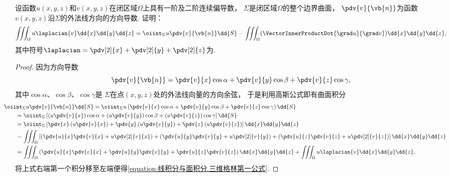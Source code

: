 \begin{example}[三维格林第一公式]
设函数\(u(x,y,z)\)和\(v(x,y,z)\)在闭区域\(\Omega\)上具有一阶及二阶连续偏导数，
\(\Sigma\)是闭区域\(\Omega\)的整个边界曲面，
\(\pdv{v}{\vb{n}}\)为函数\(v(x,y,z)\)沿\(\Sigma\)的外法线方向的方向导数.
证明：\begin{equation}\label{equation:线积分与面积分.三维格林第一公式}
	\iiint_\Omega u \laplacian{v} \dd{x}\dd{y}\dd{z}
	= \oiint_\Sigma u \pdv{v}{\vb{n}} \dd{S}
	- \iiint_\Omega (\VectorInnerProductDot{\grad u}{\grad v}) \dd{x}\dd{y}\dd{z},
\end{equation}
其中符号\(\laplacian = \pdv[2]{x} + \pdv[2]{y} + \pdv[2]{z}\)为.
\begin{proof}
因为方向导数\[
	\pdv{v}{\vb{n}}
	= \pdv{v}{x} \cos\alpha
	+ \pdv{v}{y} \cos\beta
	+ \pdv{v}{z} \cos\gamma,
\]
其中\(\cos\alpha\)、\(\cos\beta\)、\(\cos\gamma\)是
\(\Sigma\)在点\((x,y,z)\)处的外法线向量的方向余弦，
于是利用高斯公式即有曲面积分\begin{align*}
	&\hspace{-20pt}\oiint_\Sigma u \pdv{v}{\vb{n}} \dd{S}
	= \oiint_\Sigma u \left(
			\pdv{v}{x} \cos\alpha
			+ \pdv{v}{y} \cos\beta
			+ \pdv{v}{z} \cos\gamma
		\right) \dd{S} \\
	&= \oiint_\Sigma \left[
			\left( u \pdv{v}{x} \right) \cos\alpha
			+ \left( u \pdv{v}{y} \right) \cos\beta
			+ \left( u \pdv{v}{z} \right) \cos\gamma
		\right] \dd{S} \\
	&= \oiint_\Sigma \left[
			\pdv{x} \left( u \pdv{v}{x} \right)
			+ \pdv{y} \left( u \pdv{v}{y} \right)
			+ \pdv{z} \left( u \pdv{v}{z} \right)
		\right] \dd{x}\dd{y}\dd{z} \\
	&= \iiint_\Omega \left[
			\left( \pdv{u}{x} \pdv{v}{x} + u \pdv[2]{v}{x} \right)
			+ \left( \pdv{u}{y} \pdv{v}{y} + u \pdv[2]{v}{y} \right)
			+ \left( \pdv{u}{z} \pdv{v}{z} + u \pdv[2]{v}{z} \right)
		\right] \dd{x}\dd{y}\dd{z} \\
	&= \iiint_\Omega \left(
			\pdv{u}{x} \pdv{v}{x}
			+ \pdv{u}{y} \pdv{v}{y}
			+ \pdv{u}{z} \pdv{v}{z}
		\right) \dd{x}\dd{y}\dd{z}
		+ \iiint_\Omega u \laplacian{v} \dd{x}\dd{y}\dd{z},
\end{align*}
将上式右端第一个积分移至左端便得\cref{equation:线积分与面积分.三维格林第一公式}.
\end{proof}
\end{example}

